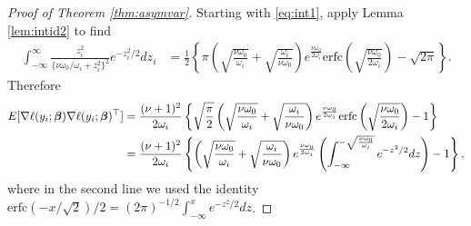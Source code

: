 \documentclass[12pt]{article}
\newcommand{\Exp}[1]{{\rm{E}}[ #1 ]}
\newcommand{\bs}[1]{\boldsymbol #1}
\begin{document}
\begin{proof}[Proof of Theorem \ref{thm:asymvar}]
Starting with \eqref{eq:int1}, apply Lemma \ref{lem:intid2} to find
\begin{equation*}
\begin{aligned}
    \int_{-\infty}^\infty \frac{z_i^2}{\{\nu \omega_0/\omega_i + z_i^2\}^2 } e^{-z_i^2 / 2} dz_i &= \frac{1}{2}\left\{\pi \left(\sqrt{\frac{\nu \omega_0}{\omega_i}} + \sqrt{\frac{\omega_i}{\nu \omega_0}} \right) e^{\frac{\nu \omega_0}{2\omega_i}} \mathrm{erfc}\left(\sqrt{\frac{\nu \omega_0}{2\omega_i}} \right) -\sqrt{2\pi} \right\}.
\end{aligned}
\end{equation*}
Therefore
\begin{equation*}
\begin{aligned}
    \Exp{  \nabla \ell(y_i ; \bs{\beta}) \nabla \ell(y_i ; \bs{\beta})^\top} &= \frac{(\nu+1)^2}{2\omega_i}\left\{\sqrt{\frac{\pi}{2}} \left(\sqrt{\frac{\nu \omega_0}{\omega_i}} + \sqrt{\frac{\omega_i}{\nu \omega_0}} \right) e^{\frac{\nu \omega_0}{2\omega_i}} \mathrm{erfc}\left(\sqrt{\frac{\nu \omega_0}{2\omega_i}} \right) - 1 \right\} \\
    &= \frac{(\nu+1)^2}{2\omega_i}\left\{ \left(\sqrt{\frac{\nu \omega_0}{\omega_i}} + \sqrt{\frac{\omega_i}{\nu \omega_0}} \right) e^{\frac{\nu \omega_0}{2\omega_i}} \left(\int_{-\infty}^{-\sqrt{\frac{\nu \omega_0}{\omega_i}}} e^{-z^2/2} dz\right) - 1 \right\},
\end{aligned}
\end{equation*}
where in the second line we used the identity $\mathrm{erfc}(-x/\sqrt{2}) / 2 = (2\pi)^{-1/2} \int_{-\infty}^x e^{-z^2/2} dz$.


\end{proof}
\end{document}
